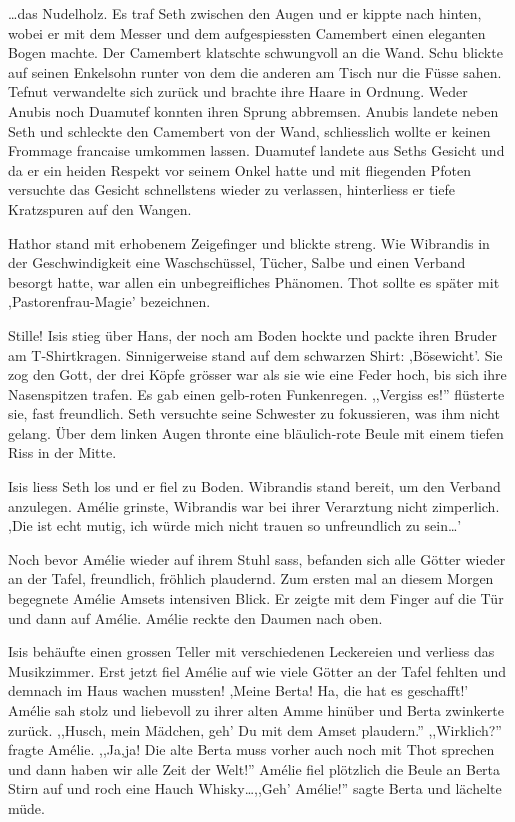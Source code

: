 \documentclass[11pt,titlepage,a5paper]{book}
\begin{document}
\dots das Nudelholz. Es traf Seth zwischen den Augen und er kippte nach hinten, wobei er mit dem Messer und dem aufgespiessten Camembert einen eleganten Bogen machte. Der Camembert klatschte schwungvoll an die Wand. Schu blickte auf seinen Enkelsohn runter von dem die anderen am Tisch nur die Füsse sahen. Tefnut verwandelte sich zurück und brachte ihre Haare in Ordnung. Weder Anubis noch Duamutef konnten ihren Sprung abbremsen. Anubis landete neben Seth und schleckte den Camembert von der Wand, schliesslich wollte er keinen Frommage francaise umkommen lassen. Duamutef landete aus Seths Gesicht und da er ein heiden Respekt vor seinem Onkel hatte und mit fliegenden Pfoten versuchte das Gesicht schnellstens wieder zu verlassen, hinterliess er tiefe Kratzspuren auf den Wangen.

Hathor stand mit erhobenem Zeigefinger und blickte streng. Wie Wibrandis in der Geschwindigkeit eine Waschschüssel, Tücher, Salbe und einen Verband besorgt hatte, war allen ein unbegreifliches Phänomen. Thot sollte es später mit ,Pastorenfrau-Magie' bezeichnen.

Stille! Isis stieg über Hans, der noch am Boden hockte und packte ihren Bruder am T-Shirtkragen. Sinnigerweise stand auf dem schwarzen Shirt: ,Bösewicht'. Sie zog den Gott, der drei Köpfe grösser war als sie wie eine Feder hoch, bis sich ihre Nasenspitzen trafen. Es gab einen gelb-roten Funkenregen. ,,Vergiss es!'' flüsterte sie, fast freundlich. Seth versuchte seine Schwester zu fokussieren, was ihm nicht gelang. Über dem linken Augen thronte eine bläulich-rote Beule mit einem tiefen Riss in der Mitte.

Isis liess Seth los und er fiel zu Boden. Wibrandis stand bereit, um den Verband anzulegen. Amélie grinste, Wibrandis war bei ihrer Verarztung nicht zimperlich. ,Die ist echt mutig, ich würde mich nicht trauen so unfreundlich zu sein\dots'

Noch bevor Amélie wieder auf ihrem Stuhl sass, befanden sich alle Götter wieder an der Tafel, freundlich, fröhlich plaudernd. Zum ersten mal an diesem Morgen begegnete Amélie Amsets intensiven Blick. Er zeigte mit dem Finger auf die Tür und dann auf Amélie. Amélie reckte den Daumen nach oben. 

Isis behäufte einen grossen Teller mit verschiedenen Leckereien und verliess das Musikzimmer. Erst jetzt fiel Amélie auf wie viele Götter an der Tafel fehlten und demnach im Haus wachen mussten! ,Meine Berta! Ha, die hat es geschafft!' Amélie sah stolz und liebevoll zu ihrer alten Amme hinüber und Berta zwinkerte zurück. ,,Husch, mein Mädchen, geh' Du mit dem Amset plaudern.'' ,,Wirklich?'' fragte Amélie. ,,Ja,ja! Die alte Berta muss vorher auch noch mit Thot sprechen und dann haben wir alle Zeit der Welt!''  Amélie fiel plötzlich die Beule an Berta Stirn auf und roch eine Hauch Whisky\dots ,,Geh' Amélie!'' sagte Berta und lächelte müde.
\end{document}
